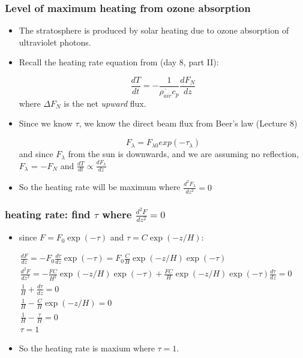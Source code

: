 \documentclass[hyperref={colorlinks=true,linkcolor=blue,urlcolor=blue},numbers]{beamer}
\begin{document}
  \begin{frame}
    \frametitle{ Level of maximum heating from ozone absorption}

    \begin{itemize}
    \item The stratosphere is produced by solar heating due to ozone absorption of
ultraviolet photons.  

\item Recall the heating rate equation from (day 8, part II):

  \begin{equation*}
    \frac{ dT}{dt} = - \frac{1 }{\overline{\rho_{air}} c_p} \frac{ d F_N}{d z} 
  \end{equation*}
where $\Delta F_N$ is the net \textit{upward} flux.  


\item Since we know $\tau$, we know the direct beam flux from Beer's law (Lecture 8)

  \begin{equation*}
    F_\lambda = F_{\lambda 0} exp (- \tau_\lambda)
  \end{equation*}
and since $F_\lambda$ from the sun is downwards, and we are assuming no reflection,
$F_\lambda$ = $-F_N$ and $\frac{ dT}{dt}  \propto \frac{ dF_\lambda}{dz}$ 


\item So the heating rate will be maximum where $\frac{ d^2F_\lambda}{dz^2} = 0$

    \end{itemize}
  \end{frame}


  \begin{frame}
    \frametitle{heating rate: find $\tau$ where $\frac{ d^2F}{dz^2} = 0$  }

    \begin{itemize}
    \item since $F = F_0\exp(-\tau)$ and $\tau = C \exp(-z/H)$:
    \end{itemize}

      \begin{gather*}
        \frac{ dF}{dz} = -F_0 \frac{ d\tau}{dz} \exp(-\tau) = F_0 \frac{ C}{H} \exp(-z/H) \exp(-\tau) \\
\frac{ d^2F}{dz^2} = -\frac{ F C}{H^2}  \exp(-z/H) \exp(-\tau) +  \frac{ F C}{H}  \exp(-z/H) \exp(-\tau)\frac{d\tau }{dz}   = 0 \\
\frac{ 1}{H}  + \frac{ d \tau}{dz} =0 \\
\frac{1 }{H}  - \frac{C }{H}  \exp(-z/H) = 0 \\
\frac{1 }{H}  - \frac{ \tau}{H}  = 0 \\
\tau = 1
      \end{gather*}
      \begin{itemize}
      \item So the heating rate is maxium where $\tau=1$.
      \end{itemize}
  \end{frame}
\end{document}
